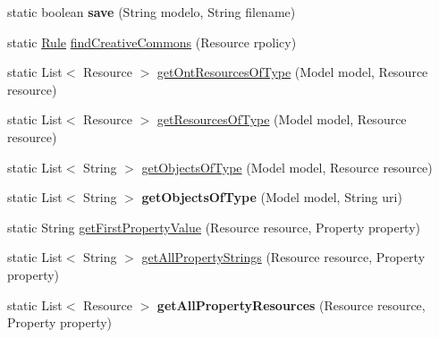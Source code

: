 \begin{DoxyCompactItemize}
\item 
\hypertarget{classodrlmodel_1_1_r_d_f_utils_afa67328ddc30751b2ec763cfa96c6656}{static boolean {\bfseries save} (String modelo, String filename)}\label{classodrlmodel_1_1_r_d_f_utils_afa67328ddc30751b2ec763cfa96c6656}

\item 
static \hyperlink{classodrlmodel_1_1_rule}{Rule} \hyperlink{classodrlmodel_1_1_r_d_f_utils_a6d5c9c89380bd3acd24146ba5d606c2d}{find\-Creative\-Commons} (Resource rpolicy)
\item 
static List$<$ Resource $>$ \hyperlink{classodrlmodel_1_1_r_d_f_utils_abefc86cbe6d583263d886dced6270c26}{get\-Ont\-Resources\-Of\-Type} (Model model, Resource resource)
\item 
static List$<$ Resource $>$ \hyperlink{classodrlmodel_1_1_r_d_f_utils_a20fbbdb205c54764d7992b435c160683}{get\-Resources\-Of\-Type} (Model model, Resource resource)
\item 
static List$<$ String $>$ \hyperlink{classodrlmodel_1_1_r_d_f_utils_a53b83408867f19677312116d888cfacb}{get\-Objects\-Of\-Type} (Model model, Resource resource)
\item 
\hypertarget{classodrlmodel_1_1_r_d_f_utils_a238265d7601a0db59f324ab8212b33a2}{static List$<$ String $>$ {\bfseries get\-Objects\-Of\-Type} (Model model, String uri)}\label{classodrlmodel_1_1_r_d_f_utils_a238265d7601a0db59f324ab8212b33a2}

\item 
static String \hyperlink{classodrlmodel_1_1_r_d_f_utils_a92339438ffa0a28247f1f1b0427bb5a6}{get\-First\-Property\-Value} (Resource resource, Property property)
\item 
static List$<$ String $>$ \hyperlink{classodrlmodel_1_1_r_d_f_utils_a7050cd7280dcf28585463eddb174180e}{get\-All\-Property\-Strings} (Resource resource, Property property)
\item 
\hypertarget{classodrlmodel_1_1_r_d_f_utils_a90d0a9bbf8b99e64afe5f1e5fd636fe7}{static List$<$ Resource $>$ {\bfseries get\-All\-Property\-Resources} (Resource resource, Property property)}\label{classodrlmodel_1_1_r_d_f_utils_a90d0a9bbf8b99e64afe5f1e5fd636fe7}

\end{DoxyCompactItemize}
